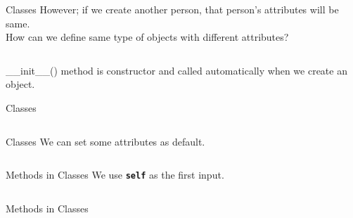         \begin{frame}{Classes}
            However; if we create another person, that person's attributes will be same.\\

            How can we define same type of objects with different attributes?
            \inputminted[frame=single,framesep=2pt, lastline = 20]{python3}{code_examples/class2.py}
            \_\_init\_\_() method is constructor and called automatically when we create an object.
        \end{frame}

        \begin{frame}{Classes}
            \inputminted[frame=single,framesep=2pt, lastline = 20]{python3}{code_examples/class_imp2.py}
        \end{frame}

        \begin{frame}{Classes}
            We can set some attributes as default.
            
            \inputminted[frame=single,framesep=2pt, lastline = 20]{python3}{code_examples/class3.py}
        \end{frame}

        \begin{frame}{Methods in Classes}
           We use \texttt{\textbf{self}} as the first input. 
           \small \inputminted[frame=single,framesep=1pt, lastline = 20]{python3}{code_examples/class4.py}
        \end{frame}

        \begin{frame}{Methods in Classes}
            \inputminted[frame=single,framesep=1pt, lastline = 20]{python3}{code_examples/class_imp4.py}
         \end{frame}

